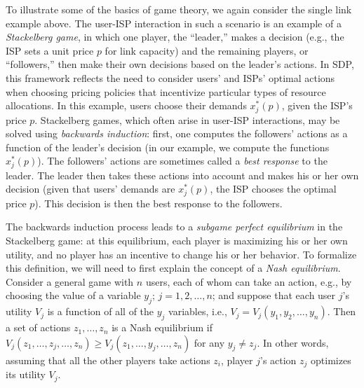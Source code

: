 To illustrate some of the basics of game theory, we again consider the single link example above. The user-ISP interaction in such a scenario is an example of a \emph{Stackelberg game}, in which one player, the ``leader,'' makes a decision (e.g., the ISP sets a unit price $p$ for link capacity) and the remaining players, or ``followers,'' then make their own decisions based on the leader's actions. In SDP, this framework reflects the need to consider users' and ISPs' optimal actions when choosing pricing policies that incentivize particular types of resource allocations. In this example, users choose their demands $x_j^\ast(p)$, given the ISP's price $p$. Stackelberg games, which often arise in user-ISP interactions, may be solved using \emph{backwards induction}: first, one computes the followers' actions as a function of the leader's decision (in our example, we compute the functions $x_j^\ast(p)$). The followers' actions are sometimes called a \emph{best response} to the leader. The leader then takes these actions into account and makes his or her own decision (given that users' demands are $x_j^\ast(p)$, the ISP chooses the optimal price $p$). This decision is then the best response to the followers.

The backwards induction process leads to a \emph{subgame perfect equilibrium} in the Stackelberg game: at this equilibrium, each player is maximizing his or her own utility, and no player has an incentive to change his or her behavior. To formalize this definition, we will need to first explain the concept of a \emph{Nash equilibrium}. Consider a general game with $n$ users, each of whom can take an action, e.g., by choosing the value of a variable $y_j$; $j = 1,2,\ldots,n$; and suppose that each user $j$'s utility $V_j$ is a function of all of the $y_j$ variables, i.e., $V_j = V_j\left(y_1,y_2,\ldots,y_n\right)$. Then a set of actions $z_1,\ldots,z_n$ is a Nash equilibrium if $V_j\left(z_1,\ldots,z_j,\ldots,z_n\right) \geq V_j\left(z_1,\ldots,y_j,\ldots,z_n\right)$ for any $y_j \neq z_j$. In other words, assuming that all the other players take actions $z_i$, player $j$'s action $z_j$ optimizes its utility $V_j$.

